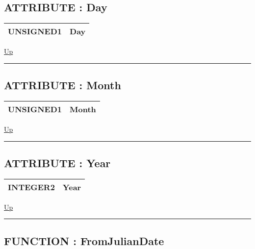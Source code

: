 \subsection*{ATTRIBUTE : Day}
\hypertarget{ecldoc:date.tojulianymd.result.day}{}

{\renewcommand{\arraystretch}{1.5}
\begin{tabularx}{\textwidth}{|>{\raggedright\arraybackslash}l|X|}
\hline
\hspace{0pt}UNSIGNED1 & Day \\
\hline
\end{tabularx}
}

\hyperlink{ecldoc:date.tojulianymd}{Up}

\par


\rule{\textwidth}{0.4pt}
\subsection*{ATTRIBUTE : Month}
\hypertarget{ecldoc:date.tojulianymd.result.month}{}

{\renewcommand{\arraystretch}{1.5}
\begin{tabularx}{\textwidth}{|>{\raggedright\arraybackslash}l|X|}
\hline
\hspace{0pt}UNSIGNED1 & Month \\
\hline
\end{tabularx}
}

\hyperlink{ecldoc:date.tojulianymd}{Up}

\par


\rule{\textwidth}{0.4pt}
\subsection*{ATTRIBUTE : Year}
\hypertarget{ecldoc:date.tojulianymd.result.year}{}

{\renewcommand{\arraystretch}{1.5}
\begin{tabularx}{\textwidth}{|>{\raggedright\arraybackslash}l|X|}
\hline
\hspace{0pt}INTEGER2 & Year \\
\hline
\end{tabularx}
}

\hyperlink{ecldoc:date.tojulianymd}{Up}

\par


\rule{\textwidth}{0.4pt}


\subsection*{FUNCTION : FromJulianDate}
\hypertarget{ecldoc:date.fromjuliandate}{}

